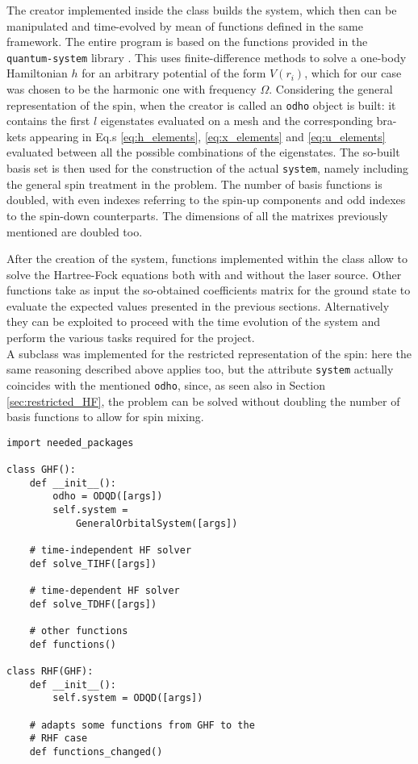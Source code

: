 The creator implemented inside the class builds the system, which then can be manipulated and time-evolved by mean of functions defined in the same framework.
The entire program is based on the functions provided in the \texttt{quantum-system} library \cite{gitOyvind}.
This uses finite-difference methods to solve a one-body Hamiltonian $h$ for an arbitrary potential of the form $V(r_i)$, which for our case was chosen to be the harmonic one with frequency $\Omega$. Considering the general representation of the spin, when the creator is called an \texttt{odho} object is built: it contains the first $l$ eigenstates evaluated on a mesh and the corresponding bra-kets appearing in Eq.s \ref{eq:h_elements}, \ref{eq:x_elements} and \ref{eq:u_elements} evaluated between all the possible combinations of the eigenstates. The so-built basis set is then used for the construction of the actual \texttt{system}, namely including the general spin treatment in the problem. The number of basis functions is doubled, with even indexes referring to the spin-up components and odd indexes to the spin-down counterparts. The dimensions of all the matrixes previously mentioned are doubled too. 

After the creation of the system, functions implemented within the class allow to solve the Hartree-Fock equations both with and without the laser source. Other functions take as input the so-obtained coefficients matrix for the ground state to evaluate the expected values presented in the previous sections. Alternatively they can be exploited to proceed with the time evolution of the system and perform the various tasks required for the project. \\

A subclass was implemented for the restricted representation of the spin: here the same reasoning described above applies too, but the attribute \texttt{system} actually coincides with the mentioned \texttt{odho}, since, as seen also in Section \ref{sec:restricted_HF}, the problem can be solved without doubling the number of basis functions to allow for spin mixing.


\begin{verbatim}
import needed_packages 

class GHF():
    def __init__():
        odho = ODQD([args])
        self.system = 
            GeneralOrbitalSystem([args])
    
    # time-independent HF solver
    def solve_TIHF([args])
    
    # time-dependent HF solver
    def solve_TDHF([args])
    
    # other functions
    def functions()

class RHF(GHF):
    def __init__():
        self.system = ODQD([args])
    
    # adapts some functions from GHF to the
    # RHF case
    def functions_changed()
    
\end{verbatim}

 
